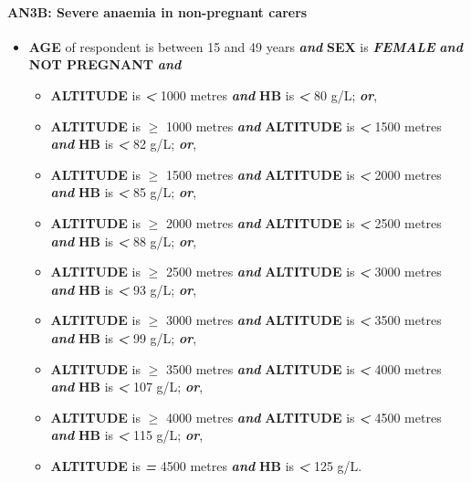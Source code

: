\documentclass[12pt,a4paper]{article}
\let\oldparagraph\paragraph
\renewcommand{\paragraph}[1]{\oldparagraph{#1}\mbox{}}
\begin{document}
\hypertarget{an3b-severe-anaemia-in-non-pregnant-carers}{%
\paragraph{AN3B: Severe anaemia in non-pregnant carers}\label{an3b-severe-anaemia-in-non-pregnant-carers}}

\begin{itemize}
\item
  \textbf{AGE} of respondent is between 15 and 49 years \textbf{\emph{and}} \textbf{SEX} is \textbf{\emph{FEMALE}} \textbf{\emph{and}} \textbf{NOT PREGNANT} \textbf{\emph{and}}

  \begin{itemize}
  \item
    \textbf{ALTITUDE} is \textbf{\emph{\textless{}}} 1000 metres \textbf{\emph{and}} \textbf{HB} is \textbf{\emph{\textless{}}} 80 g/L; \textbf{\emph{or}},
  \item
    \textbf{ALTITUDE} is \textbf{\emph{\(\geq\)}} 1000 metres \textbf{\emph{and}} \textbf{ALTITUDE} is \textbf{\emph{\textless{}}} 1500 metres \textbf{\emph{and}} \textbf{HB} is \textbf{\emph{\textless{}}} 82 g/L; \textbf{\emph{or}},
  \item
    \textbf{ALTITUDE} is \textbf{\emph{\(\geq\)}} 1500 metres \textbf{\emph{and}} \textbf{ALTITUDE} is \textbf{\emph{\textless{}}} 2000 metres \textbf{\emph{and}} \textbf{HB} is \textbf{\emph{\textless{}}} 85 g/L; \textbf{\emph{or}},
  \item
    \textbf{ALTITUDE} is \textbf{\emph{\(\geq\)}} 2000 metres \textbf{\emph{and}} \textbf{ALTITUDE} is \textbf{\emph{\textless{}}} 2500 metres \textbf{\emph{and}} \textbf{HB} is \textbf{\emph{\textless{}}} 88 g/L; \textbf{\emph{or}},
  \item
    \textbf{ALTITUDE} is \textbf{\emph{\(\geq\)}} 2500 metres \textbf{\emph{and}} \textbf{ALTITUDE} is \textbf{\emph{\textless{}}} 3000 metres \textbf{\emph{and}} \textbf{HB} is \textbf{\emph{\textless{}}} 93 g/L; \textbf{\emph{or}},
  \item
    \textbf{ALTITUDE} is \textbf{\emph{\(\geq\)}} 3000 metres \textbf{\emph{and}} \textbf{ALTITUDE} is \textbf{\emph{\textless{}}} 3500 metres \textbf{\emph{and}} \textbf{HB} is \textbf{\emph{\textless{}}} 99 g/L; \textbf{\emph{or}},
  \item
    \textbf{ALTITUDE} is \textbf{\emph{\(\geq\)}} 3500 metres \textbf{\emph{and}} \textbf{ALTITUDE} is \textbf{\emph{\textless{}}} 4000 metres \textbf{\emph{and}} \textbf{HB} is \textbf{\emph{\textless{}}} 107 g/L; \textbf{\emph{or}},
  \item
    \textbf{ALTITUDE} is \textbf{\emph{\(\geq\)}} 4000 metres \textbf{\emph{and}} \textbf{ALTITUDE} is \textbf{\emph{\textless{}}} 4500 metres \textbf{\emph{and}} \textbf{HB} is \textbf{\emph{\textless{}}} 115 g/L; \textbf{\emph{or}},
  \item
    \textbf{ALTITUDE} is \textbf{\emph{=}} 4500 metres \textbf{\emph{and}} \textbf{HB} is \textbf{\emph{\textless{}}} 125 g/L.
  \end{itemize}
\end{itemize}
\end{document}
